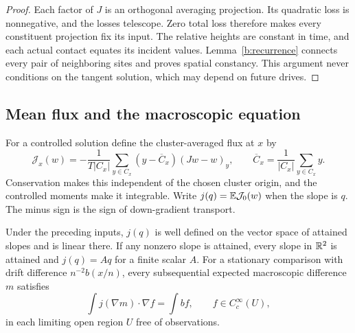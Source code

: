 \begin{proof}
Each factor of $J$ is an orthogonal averaging projection. Its quadratic
loss is nonnegative, and the losses telescope. Zero total loss therefore
makes every constituent projection fix its input. The relative heights
are constant in time, and each actual contact equates its incident values.
Lemma~\ref{b:recurrence} connects every pair of neighboring sites and
proves spatial constancy. This argument never conditions on the tangent
solution, which may depend on future drives.
\end{proof}

\subsection{Mean flux and the macroscopic equation}

For a controlled solution define the cluster-averaged flux at $x$ by
\begin{equation}\label{b:flux-definition}
 \mathcal J_x(w)=
 -\frac1{T|C_x|}\sum_{y\in C_x}(y-\overline C_x)(Jw-w)_y,
 \qquad
 \overline C_x=\frac1{|C_x|}\sum_{y\in C_x}y.
\end{equation}
Conservation makes this independent of the chosen cluster origin, and the
controlled moments make it integrable. Write $j(q)=\mathbb E\mathcal J_0(w)$
when the slope is $q$. The minus sign is the sign of down-gradient transport.

\begin{proposition}\label{b:cell}
Under the preceding inputs, $j(q)$ is well defined on the vector space of
attained slopes and is linear there. If any nonzero slope is attained,
every slope in $\mathbb R^2$ is attained and $j(q)=Aq$ for a finite scalar $A$.
For a stationary comparison with drift difference $n^{-2}b(x/n)$,
every subsequential expected macroscopic difference $m$ satisfies
\begin{equation}\label{b:weak-equation}
 \int j(\nabla m)\cdot\nabla f=\int b f,
 \qquad f\in C_c^\infty(U),
\end{equation}
in each limiting open region $U$ free of observations.
\end{proposition}

